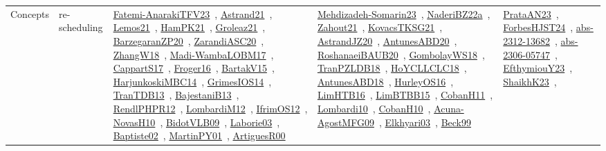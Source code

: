 {\begin{longtable}{lp{3cm}>{\raggedright\arraybackslash}p{6cm}>{\raggedright\arraybackslash}p{6cm}>{\raggedright\arraybackslash}p{8cm}}
Concepts & re-scheduling & \href{works/Fatemi-AnarakiTFV23.pdf}{Fatemi-AnarakiTFV23}~\cite{Fatemi-AnarakiTFV23}, \href{works/Astrand21.pdf}{Astrand21}~\cite{Astrand21}, \href{works/Lemos21.pdf}{Lemos21}~\cite{Lemos21}, \href{works/HamPK21.pdf}{HamPK21}~\cite{HamPK21}, \href{works/Groleaz21.pdf}{Groleaz21}~\cite{Groleaz21}, \href{works/BarzegaranZP20.pdf}{BarzegaranZP20}~\cite{BarzegaranZP20}, \href{works/ZarandiASC20.pdf}{ZarandiASC20}~\cite{ZarandiASC20}, \href{works/ZhangW18.pdf}{ZhangW18}~\cite{ZhangW18}, \href{works/Madi-WambaLOBM17.pdf}{Madi-WambaLOBM17}~\cite{Madi-WambaLOBM17}, \href{works/CappartS17.pdf}{CappartS17}~\cite{CappartS17}, \href{works/Froger16.pdf}{Froger16}~\cite{Froger16}, \href{works/BartakV15.pdf}{BartakV15}~\cite{BartakV15}, \href{works/HarjunkoskiMBC14.pdf}{HarjunkoskiMBC14}~\cite{HarjunkoskiMBC14}, \href{works/GrimesIOS14.pdf}{GrimesIOS14}~\cite{GrimesIOS14}, \href{works/TranTDB13.pdf}{TranTDB13}~\cite{TranTDB13}, \href{works/BajestaniB13.pdf}{BajestaniB13}~\cite{BajestaniB13}, \href{works/RendlPHPR12.pdf}{RendlPHPR12}~\cite{RendlPHPR12}, \href{works/LombardiM12.pdf}{LombardiM12}~\cite{LombardiM12}, \href{works/IfrimOS12.pdf}{IfrimOS12}~\cite{IfrimOS12}, \href{works/NovasH10.pdf}{NovasH10}~\cite{NovasH10}, \href{works/BidotVLB09.pdf}{BidotVLB09}~\cite{BidotVLB09}, \href{works/Laborie03.pdf}{Laborie03}~\cite{Laborie03}, \href{works/Baptiste02.pdf}{Baptiste02}~\cite{Baptiste02}, \href{works/MartinPY01.pdf}{MartinPY01}~\cite{MartinPY01}, \href{works/ArtiguesR00.pdf}{ArtiguesR00}~\cite{ArtiguesR00} & \href{works/Mehdizadeh-Somarin23.pdf}{Mehdizadeh-Somarin23}~\cite{Mehdizadeh-Somarin23}, \href{works/NaderiBZ22a.pdf}{NaderiBZ22a}~\cite{NaderiBZ22a}, \href{works/Zahout21.pdf}{Zahout21}~\cite{Zahout21}, \href{works/KovacsTKSG21.pdf}{KovacsTKSG21}~\cite{KovacsTKSG21}, \href{works/AstrandJZ20.pdf}{AstrandJZ20}~\cite{AstrandJZ20}, \href{works/AntunesABD20.pdf}{AntunesABD20}~\cite{AntunesABD20}, \href{works/RoshanaeiBAUB20.pdf}{RoshanaeiBAUB20}~\cite{RoshanaeiBAUB20}, \href{works/GombolayWS18.pdf}{GombolayWS18}~\cite{GombolayWS18}, \href{works/TranPZLDB18.pdf}{TranPZLDB18}~\cite{TranPZLDB18}, \href{works/HoYCLLCLC18.pdf}{HoYCLLCLC18}~\cite{HoYCLLCLC18}, \href{works/AntunesABD18.pdf}{AntunesABD18}~\cite{AntunesABD18}, \href{works/HurleyOS16.pdf}{HurleyOS16}~\cite{HurleyOS16}, \href{works/LimHTB16.pdf}{LimHTB16}~\cite{LimHTB16}, \href{works/LimBTBB15.pdf}{LimBTBB15}~\cite{LimBTBB15}, \href{works/CobanH11.pdf}{CobanH11}~\cite{CobanH11}, \href{works/Lombardi10.pdf}{Lombardi10}~\cite{Lombardi10}, \href{works/CobanH10.pdf}{CobanH10}~\cite{CobanH10}, \href{works/Acuna-AgostMFG09.pdf}{Acuna-AgostMFG09}~\cite{Acuna-AgostMFG09}, \href{works/Elkhyari03.pdf}{Elkhyari03}~\cite{Elkhyari03}, \href{works/Beck99.pdf}{Beck99}~\cite{Beck99} & \href{works/PrataAN23.pdf}{PrataAN23}~\cite{PrataAN23}, \href{works/ForbesHJST24.pdf}{ForbesHJST24}~\cite{ForbesHJST24}, \href{works/abs-2312-13682.pdf}{abs-2312-13682}~\cite{abs-2312-13682}, \href{works/abs-2306-05747.pdf}{abs-2306-05747}~\cite{abs-2306-05747}, \href{works/EfthymiouY23.pdf}{EfthymiouY23}~\cite{EfthymiouY23}, \href{works/ShaikhK23.pdf}{ShaikhK23}~\cite{ShaikhK23}, 
\end{longtable}}
